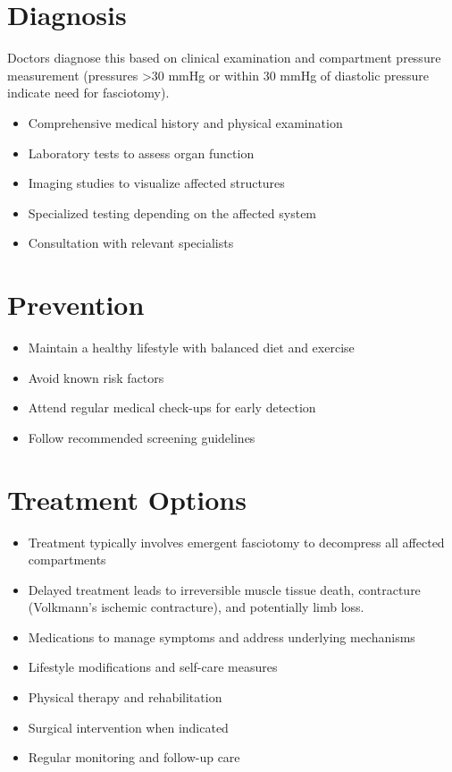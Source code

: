 \section{Diagnosis}
Doctors diagnose this based on clinical examination and compartment pressure measurement (pressures >30 mmHg or within 30 mmHg of diastolic pressure indicate need for fasciotomy).

\begin{itemize}[noitemsep]
  \item Comprehensive medical history and physical examination
  \item Laboratory tests to assess organ function
  \item Imaging studies to visualize affected structures
  \item Specialized testing depending on the affected system
  \item Consultation with relevant specialists
\end{itemize}
\section{Prevention}
\begin{itemize}[noitemsep]
  \item Maintain a healthy lifestyle with balanced diet and exercise
  \item Avoid known risk factors
  \item Attend regular medical check-ups for early detection
  \item Follow recommended screening guidelines
\end{itemize}
\section{Treatment Options}
\begin{itemize}[noitemsep]
  \item Treatment typically involves emergent fasciotomy to decompress all affected compartments
  \item Delayed treatment leads to irreversible muscle tissue death, contracture (Volkmann's ischemic contracture), and potentially limb loss.
  \item Medications to manage symptoms and address underlying mechanisms
  \item Lifestyle modifications and self-care measures
  \item Physical therapy and rehabilitation
  \item Surgical intervention when indicated
  \item Regular monitoring and follow-up care
\end{itemize}
